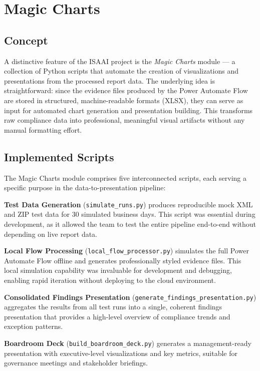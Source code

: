 \documentclass[11pt,a4paper]{article}
\begin{document}
\section{Magic Charts}

\subsection{Concept}

A distinctive feature of the ISAAI project is the \emph{Magic Charts} module --- a collection of Python scripts that automate the creation of visualizations and presentations from the processed report data. The underlying idea is straightforward: since the evidence files produced by the Power Automate Flow are stored in structured, machine-readable formats (XLSX), they can serve as input for automated chart generation and presentation building. This transforms raw compliance data into professional, meaningful visual artifacts without any manual formatting effort.

\subsection{Implemented Scripts}

The Magic Charts module comprises five interconnected scripts, each serving a specific purpose in the data-to-presentation pipeline:

\begingroup\sloppy
\textbf{Test Data Generation} (\texttt{simulate\_runs.py}) produces reproducible mock XML and ZIP test data for 30 simulated business days. This script was essential during development, as it allowed the team to test the entire pipeline end-to-end without depending on live report data.

\textbf{Local Flow Processing} (\texttt{local\_flow\_processor.py}) simulates the full Power Automate Flow offline and generates professionally styled evidence files. This local simulation capability was invaluable for development and debugging, enabling rapid iteration without deploying to the cloud environment.

\textbf{Consolidated Findings Presentation} (\texttt{generate\_findings\_presentation.py}) aggregates the results from all test runs into a single, coherent findings presentation that provides a high-level overview of compliance trends and exception patterns.

\textbf{Boardroom Deck} (\texttt{build\_boardroom\_deck.py}) generates a management-ready presentation with executive-level visualizations and key metrics, suitable for governance meetings and stakeholder briefings.
\end{document}
